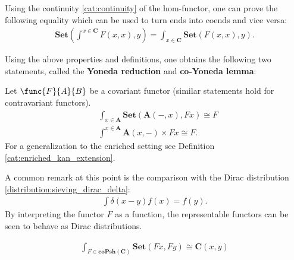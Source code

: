     \begin{property}
        Using the continuity \ref{cat:continuity} of the hom-functor, one can prove the following equality which can be used to turn ends into coends and vice versa:
        \begin{gather}
            \mathbf{Set}\left(\int^{x\in\mathbf{C}}F(x,x),y\right) = \int_{x\in\mathbf{C}}\mathbf{Set}\left(F(x,x),y\right).
        \end{gather}
    \end{property}

    Using the above properties and definitions, one obtains the following two statements, called the \textbf{Yoneda reduction} and \textbf{co-Yoneda lemma}:
    \begin{property}\label{cat:ninja_yoneda}
        Let $\func{F}{A}{B}$ be a covariant functor (similar statements hold for contravariant functors).
        \begin{align}
            &\int_{x\in\mathbf{A}}\mathbf{Set}\left(\mathbf{A}(-,x),Fx\right)\cong F\\
            &\int^{x\in\mathbf{A}}\mathbf{A}(x,-)\times Fx\cong F.
        \end{align}
        For a generalization to the enriched setting see Definition \ref{cat:enriched_kan_extension}.
    \end{property}
    \begin{remark}
        A common remark at this point is the comparison with the Dirac distribution \ref{distribution:sieving_dirac_delta}:
        \begin{gather}
            \int \delta(x-y)f(x) = f(y).
        \end{gather}
        By interpreting the functor $F$ as a function, the representable functors can be seen to behave as Dirac distributions.
    \end{remark}

    \begin{property}
        \begin{gather}
            \int_{F\in\mathbf{coPsh}(\mathbf{C})}\mathbf{Set}(Fx,Fy)\cong\mathbf{C}(x,y)
        \end{gather}
    \end{property}



